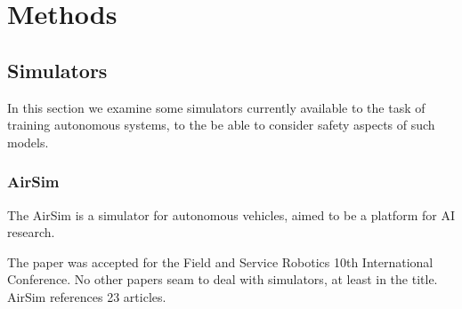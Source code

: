 

\chapter{Methods}
\label{Methods} 

\section{Simulators}

In this section we examine some simulators currently available to the task of training autonomous systems, to the be able to consider safety aspects of such models.

\subsection{AirSim}

The AirSim \cite{airsim2017fsr} is a simulator for autonomous vehicles, aimed to be a platform for AI research.

The paper was accepted for the Field and Service Robotics 10th International Conference. No other papers seam to deal with simulators, at least in the title. AirSim references 23 articles.

